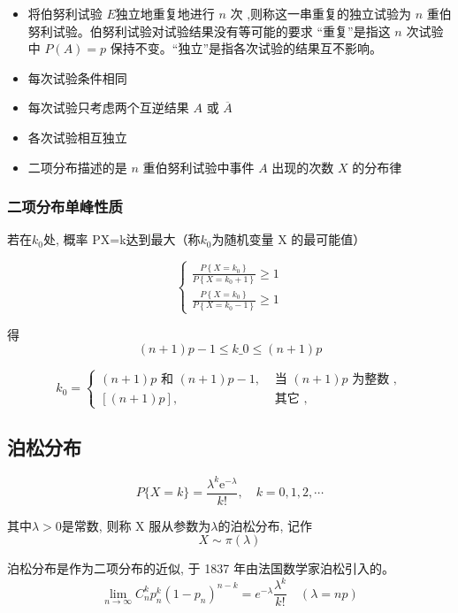 \begin{itemize}
    \item 将伯努利试验 $E$独立地重复地进行 $n$ 次 ,则称这一串重复的独立试验为 $n$ 重伯努利试验。伯努利试验对试验结果没有等可能的要求 “重复”是指这 $n$ 次试验中 $P(A)= p$ 保持不变。“独立”是指各次试验的结果互不影响。
    \item 每次试验条件相同
    \item 每次试验只考虑两个互逆结果 $A$ 或 $\overline{A}$
    \item 各次试验相互独立
    \item 二项分布描述的是 $n$ 重伯努利试验中事件 $A$ 出现的次数 $X$ 的分布律
\end{itemize}

\subsubsection{二项分布单峰性质}

若在$k_0$处, 概率 P{X=k}达到最大（称$k_0$为随机变量 X 的最可能值）

$$
\left\{\begin{array}{l}
\frac{P\left\{X=k_{0}\right\}}{P\left\{X=k_{0}+1\right\}} \geq 1 \\
\frac{P\left\{X=k_{0}\right\}}{P\left\{X=k_{0}-1\right\}} \geq 1
\end{array}\right.
$$

得
$$ (n+1) p-1 \leq k\_{0} \leq(n+1) p $$

$$
k_{0}=\left\{\begin{array}{ll}
(n+1) p \text { 和 }(n+1) p-1, & \text { 当 }({n}+{1}) {p} \text { 为整数 }, \\
{[(n+1) p],} & \text { 其它 },
\end{array}\right.
$$

\subsection{泊松分布}

$$
{P}\{{X}={k}\}=\frac{\lambda^{k} \mathrm{e}^{-\lambda}}{{k} !}, \quad {k}={0}, {1}, {2}, \cdots
$$

其中$\lambda > 0$是常数, 则称 X 服从参数为$\lambda$的泊松分布, 记作
$$ X \sim \pi(\lambda) $$


\begin{theorem}[泊松定理]
    \label{thm:Poission}
泊松分布是作为二项分布的近似, 于 1837 年由法国数学家泊松引入的。
$$
\lim _{n \rightarrow \infty} C_{n}^{k} p_{n}^{k}\left(1-p_{n}\right)^{n-k}=e^{-\lambda} \frac{\lambda^{k}}{k !}\quad (\lambda = np)
$$
\end{theorem}

